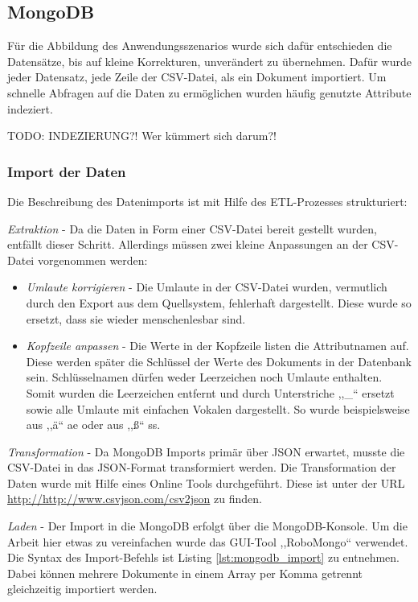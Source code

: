 \subsection{MongoDB}
Für die Abbildung des Anwendungsszenarios wurde sich dafür entschieden die Datensätze, bis auf kleine Korrekturen, unverändert zu übernehmen. Dafür wurde jeder Datensatz, jede Zeile der CSV-Datei, als ein Dokument importiert. Um schnelle Abfragen auf die Daten zu ermöglichen wurden häufig genutzte Attribute indeziert. 

TODO: INDEZIERUNG?! Wer kümmert sich darum?! 

\subsubsection{Import der Daten}
Die Beschreibung des Datenimports ist mit Hilfe des ETL-Prozesses strukturiert: 

\emph{Extraktion} - 
Da die Daten in Form einer CSV-Datei bereit gestellt wurden, entfällt dieser Schritt. Allerdings müssen zwei kleine Anpassungen an der CSV-Datei vorgenommen werden: 

\begin{itemize}
\item \textit{Umlaute korrigieren} - Die Umlaute in der CSV-Datei wurden, vermutlich durch den Export aus dem Quellsystem, fehlerhaft dargestellt. Diese wurde so ersetzt, dass sie wieder menschenlesbar sind.
\item \textit{Kopfzeile anpassen} - Die Werte in der Kopfzeile listen die Attributnamen auf. Diese werden später die Schlüssel der Werte des Dokuments in der Datenbank sein. Schlüsselnamen dürfen weder Leerzeichen noch Umlaute enthalten. Somit wurden die Leerzeichen entfernt und durch Unterstriche ,,\_`` ersetzt sowie alle Umlaute mit einfachen Vokalen dargestellt. So wurde beispielsweise aus ,,\"a`` ae oder aus ,,\ss{}`` ss. 
\end{itemize}

\emph{Transformation} - 
Da MongoDB Imports primär über JSON erwartet, musste die CSV-Datei in das JSON-Format transformiert werden. Die Transformation der Daten wurde mit Hilfe eines Online Tools durchgeführt. Diese ist unter der URL \url{http://http://www.csvjson.com/csv2json} zu finden. 

\emph{Laden} - 
Der Import in die MongoDB erfolgt über die MongoDB-Konsole. Um die Arbeit hier etwas zu vereinfachen wurde das GUI-Tool ,,RoboMongo`` verwendet. Die Syntax des Import-Befehls ist Listing \ref{lst:mongodb_import} zu entnehmen. Dabei können mehrere Dokumente in einem Array per Komma getrennt gleichzeitig importiert werden. \\

